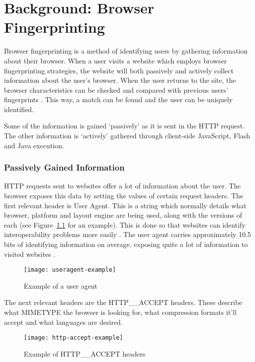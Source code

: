 \chapter{Background: Browser Fingerprinting}

Browser fingerprinting is a method of identifying users by gathering information about their browser.
When a user visits a website which employs browser fingerprinting strategies, the website will both passively and actively collect information about the user's browser.
When the user returns to the site, the browser characteristics can be checked and compared with previous users' fingerprints \citep{fingerprinting}.
This way, a match can be found and the user can be uniquely identified.

Some of the information is gained `passively' as it is sent in the HTTP request.
The other information is `actively' gathered through client-side JavaScript, Flash and Java execution.

\subsection{Passively Gained Information}

HTTP requests sent to websites offer a lot of information about the user.
The browser exposes this data by setting the values of certain request headers.
The first relevant header is User Agent.
This is a string which normally details what browser, platform and layout engine are being used, along with the versions of each (see Figure~\ref{fig:useragent-example} for an example).
This is done so that websites can identify interoperability problems more easily \citep{useragent}.
The user agent carries approximately 10.5 bits of identifying information on average, exposing quite a lot of information to visited websites \citep{useragententropy}.

\begin{figure}[h]
\caption{Example of a user agent}
\texttt{[image: useragent-example]}
\centering
\label{fig:useragent-example}
\end{figure}

The next relevant headers are the HTTP\_\_ACCEPT headers.
These describe what MIMETYPE the browser is looking for, what compression formats it'll accept and what languages are desired.

\begin{figure}[h]
\caption{Example of HTTP\_\_ACCEPT headers}
\texttt{[image: http-accept-example]}
\centering
\end{figure}

